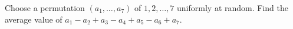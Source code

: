 Choose a permutation $(a_1,\ldots,a_7)$ of $1,2,\ldots,7$ uniformly at random. Find the average value of $a_1-a_2+a_3-a_4+a_5-a_6+a_7$.
